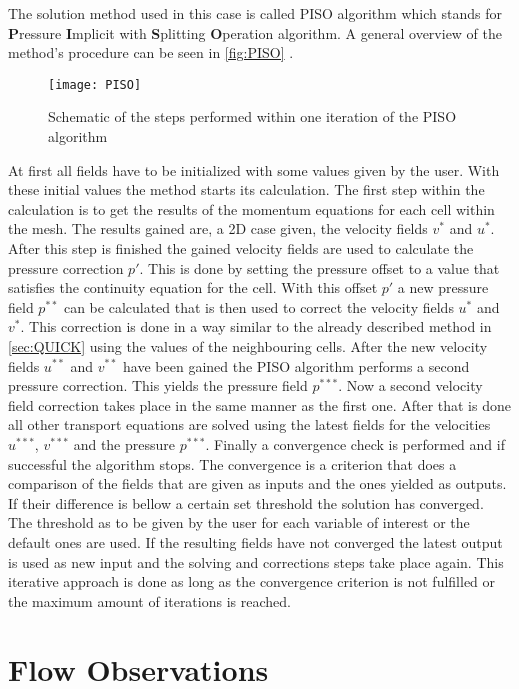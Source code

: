 \documentclass[../thesis.tex]{subfiles}
\begin{document}
The solution method used in this case is called PISO algorithm which stands for \textbf{P}ressure \textbf{I}mplicit with \textbf{S}plitting \textbf{O}peration algorithm. A general overview of the method's procedure can be seen in \autoref{fig:PISO} \cite{versteeg2007introduction}.

\begin{figure}[htbp]
	\centering
	\texttt{[image: PISO]}
	\caption{Schematic of the steps performed within one iteration of the PISO algorithm}
	\label{fig:PISO}
\end{figure}

At first all fields have to be initialized with some values given by the user. With these initial values the method starts its calculation. The first step within the calculation is to get the results of the momentum equations for each cell within the mesh. The results gained are, a 2D case given, the velocity fields $v^*$ and $u^*$. After this step is finished the gained velocity fields are used to calculate the pressure correction $p'$. This is done by setting the pressure offset to a value that satisfies the continuity equation for the cell. With this offset $p'$ a new pressure field $p^{**}$ can be calculated that is then used to correct the velocity fields $u^*$ and $v^*$. This correction is done in a way similar to the already described method in \autoref{sec:QUICK} using the values of the neighbouring cells. After the new velocity fields $u^{**}$ and $v^{**}$ have been gained the PISO algorithm performs a second pressure correction. This yields the pressure field $p^{***}$. Now a second velocity field correction takes place in the same manner as the first one. After that is done all other transport equations are solved using the latest fields for the velocities $u^{***}$, $v^{***}$ and the pressure $p^{***}$. Finally a convergence check is performed and if successful the algorithm stops. The convergence is a criterion that does a comparison of the fields that are given as inputs and the ones yielded as outputs. If their difference is bellow a certain set threshold the solution has converged. The threshold as to be given by the user for each variable of interest or the default ones are used. If the resulting fields have not converged the latest output is used as new input and the solving and corrections steps take place again. This iterative approach is done as long as the convergence criterion is not fulfilled or the maximum amount of iterations is reached.

\section{Flow Observations}
\end{document}
